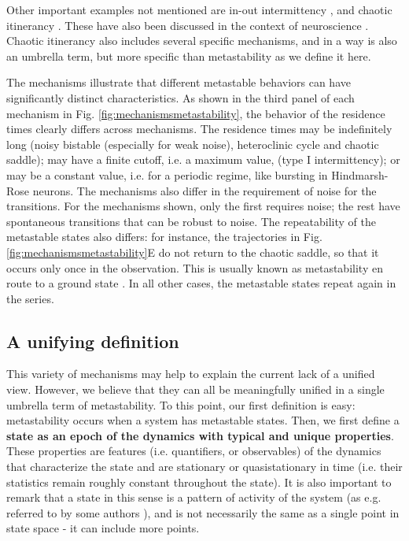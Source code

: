 \documentclass[reprint,onecolumn,superscriptaddress,showpacs,amsmath,amssymb,aps,floatfix]{revtex4-2}
\theoremstyle{definition}
\newcommand{\Emph}[1]{\textbf{#1}}
\begin{document}
Other important examples not mentioned are in-out intermittency \cite{ashwin1999transverse, ashwin2001influence}, and chaotic itinerancy \cite{kaneko2003chaotic}. These have also been discussed in the context of neuroscience \cite{saha2018characteristics, freeman2003evidence, tsuda2009hypotheses, tsuda2015chaotic, hramov2006onoff}. Chaotic itinerancy also includes several specific mechanisms, and in a way is also an umbrella term, but more specific than metastability as we define it here.

The mechanisms illustrate that different metastable behaviors can have significantly distinct characteristics.  As shown in the third panel of each mechanism in Fig. \ref{fig:mechanismsmetastability}, the behavior of the residence times clearly differs across mechanisms. The residence times may be indefinitely long (noisy bistable (especially for weak noise), heteroclinic cycle and chaotic saddle); may have a finite cutoff, i.e. a maximum value, (type I intermittency); or may be a constant value, i.e. for a periodic regime, like bursting in Hindmarsh-Rose neurons.
The mechanisms also differ in the requirement of noise for the transitions. For the mechanisms shown, only the first requires noise; the rest have spontaneous transitions that can be robust to noise. 
The repeatability of the metastable states also differs: for instance, the trajectories in Fig. \ref{fig:mechanismsmetastability}E do not return to the chaotic saddle, so that it occurs only once in the observation. This is usually known as metastability en route to a ground state \cite{brinkman2022metastable}. In all other cases, the metastable states repeat again in the series. 


\subsection*{A unifying definition}
This variety of mechanisms may help to explain the current lack of a unified view. However, we believe that they can all be meaningfully unified in a single umbrella term of metastability. To this point, our first definition is easy: metastability occurs when a system has metastable states. Then, we first define a \Emph{state as an epoch of the dynamics with typical and unique properties}. These properties are features (i.e. quantifiers, or observables) of the dynamics that characterize the state and are stationary or quasistationary in time (i.e. their statistics remain roughly constant throughout the state). It is also important to remark that a state in this sense is a pattern of activity of the system (as e.g. referred to by some authors \cite{friston2000transients}), and is not necessarily the same as a single point in state space - it can include more points. 
\end{document}
